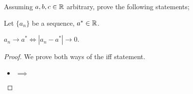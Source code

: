 \documentclass[week=2]{homework}
\date{\today}
\begin{document}
    \maketitle
    \thispagestyle{empty}
    \newpage
    \begin{questions}
		\let\firstquestion\question
		\renewcommand*{\question}{\vspace{7mm}\firstquestion}
        \firstquestion
        Assuming $a,b,c \in \mathbb{R}$ arbitrary, prove the following statements;
    
	    \question
	    Let $\{a_n\}$ be a sequence, $a^* \in \mathbb{R}$.
	    
	    \begin{inlinetoprove}
	    	$a_n \to a^* \iff |a_n - a^*| \to 0$.
	    \end{inlinetoprove}
	    \begin{proof}
	    	We prove both ways of the iff statement.
	    	\begin{itemize}
	    		\item $\implies$
	    		

\end{itemize}
\end{proof}
\end{questions}
\end{document}
